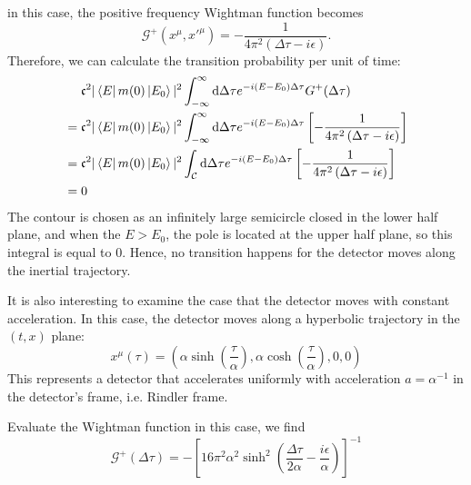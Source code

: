 \documentclass[12pt]{article}
\numberwithin{equation}{section}
\theoremstyle{1style}
\newcommand{\id}{\mathrm{d}}
\begin{document}
in this case, the positive frequency Wightman function becomes
\begin{equation}
  \mathcal{G}^+(x^{\mu},x'^{\mu})=-\frac{1}{4\pi^2\left(\Delta\tau -i\epsilon\right)}.
\end{equation}
Therefore, we can calculate the transition probability per unit of time:
\begin{align}
   & ~~~~\mathfrak{c}^2|\bra{E}m(0)\ket{E_0}|^2\int_{-\infty}^{\infty}\id \Delta\tau e^{-i(E-E_0)\Delta \tau}G^+(\Delta \tau) \\
   & = \mathfrak{c}^2|\bra{E}m(0)\ket{E_0}|^2\int_{-\infty}^{\infty}\id \Delta\tau e^{-i(E-E_0)\Delta \tau}
  \left[-\frac{1}{4\pi^2\left(\Delta\tau -i\epsilon\right)}\right]                                                            \\
   & = \mathfrak{c}^2|\bra{E}m(0)\ket{E_0}|^2\int_{\mathcal{C}}\id \Delta\tau e^{-i(E-E_0)\Delta \tau}
  \left[-\frac{1}{4\pi^2\left(\Delta\tau -i\epsilon\right)}\right]                                                            \\
   & = 0
\end{align}
The contour is chosen as an infinitely large semicircle closed in the lower half plane, and when the \(E>E_0\),
the pole is located at the upper half plane, so this integral is equal to \(0\).
Hence, no transition happens for the detector moves along the inertial trajectory.

\bigskip

It is also interesting to examine the case that the detector moves with constant acceleration.
In this case, the detector moves along a hyperbolic trajectory in the \((t,x)\) plane:
\begin{equation}
  x^{\mu}(\tau)=\left(\alpha\sinh(\frac{\tau}{\alpha}),\alpha \cosh(\frac{\tau}{\alpha}),0,0 \right)
\end{equation}
This represents a detector that accelerates uniformly with acceleration \(a=\alpha^{-1}\) in the detector's frame, i.e. Rindler frame.


Evaluate the Wightman function in this case, we find
\begin{equation}\label{2325}
  \mathcal{G}^+(\Delta\tau)=-\left[16\pi^2\alpha^2\sinh^2\left(\frac{\Delta\tau}{2\alpha}-\frac{i\epsilon}{\alpha}\right)\right]^{-1}
\end{equation}
\end{document}
